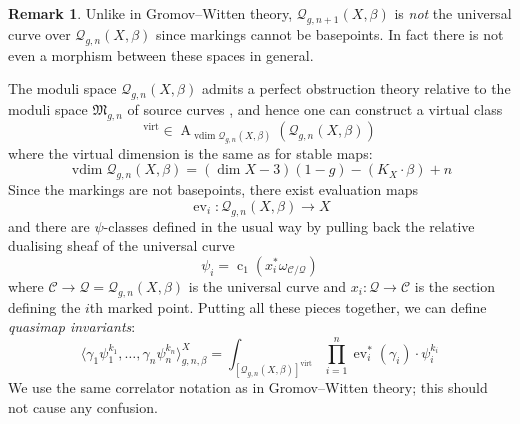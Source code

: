 \documentclass[11pt]{amsart}
\newcommand{\Q}[4]{\mathcal{Q}_{#1,#2}(#3,#4)}
\renewcommand{\to}{\rightarrow}
\newcommand{\MM}{\mathfrak M}
\newcommand{\virt}[1]{[#1]^{\operatorname{virt}}}
\newcommand{\Achow}{\operatorname{A}}
\newcommand{\ev}{\operatorname{ev}}
\newcommand{\om}[1]{\mathcal{#1}}
\theoremstyle{definition}
\theoremstyle{definition}
\newtheorem{remark}[thm]{Remark}
\newcommand{\ilemph}[1]{\emph{#1}}
\begin{document}

\begin{remark} Unlike in Gromov--Witten theory, $\Q{g}{n+1}{X}{\beta}$ is \emph{not} the universal curve over $\Q{g}{n}{X}{\beta}$ since markings cannot be basepoints. In fact there is not even a morphism between these spaces in general.\end{remark}

The moduli space $\Q{g}{n}{X}{\beta}$ admits a perfect obstruction theory relative to the moduli space $\MM_{g,n}$ of source curves \cite[\S 5]{CF-K}, and hence one can construct a virtual class
\begin{equation*} \virt{\Q{g}{n}{X}{\beta}} \in \Achow_{\operatorname{vdim}\Q{g}{n}{X}{\beta}} \left( \Q{g}{n}{X}{\beta} \right) \end{equation*}
where the virtual dimension is the same as for stable maps:
\begin{equation*} \operatorname{vdim}\Q{g}{n}{X}{\beta} = (\dim{X} - 3)(1-g) - (K_X \cdot \beta) + n \end{equation*}
Since the markings are not basepoints, there exist evaluation maps
\begin{equation*} \ev_i : \Q{g}{n}{X}{\beta} \to X \end{equation*}
and there are $\psi$-classes defined in the usual way by pulling back the relative dualising sheaf of the universal curve
\begin{equation*} \psi_i = \operatorname{c}_1(x_i^* \omega_{\mathcal{C}/\om{Q}}) \end{equation*}
where $\mathcal{C} \to \om{Q} = \Q{g}{n}{X}{\beta}$ is the universal curve and $x_i : \om{Q} \to \mathcal{C}$ is the section defining the $i$th marked point. Putting all these pieces together, we can define \ilemph{quasimap invariants}:
\begin{equation*} \langle \gamma_1 \psi_1^{k_1} , \ldots, \gamma_n \psi_n^{k_n} \rangle_{g,n,\beta}^X = \int_{\virt{\Q{g}{n}{X}{\beta}}} \prod_{i=1}^n \ev_i^* (\gamma_i) \cdot \psi_i^{k_i} \end{equation*}
We use the same correlator notation as in Gromov--Witten theory; this should not cause any confusion.
\end{document}
